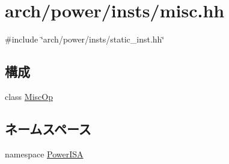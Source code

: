 \hypertarget{arch_2power_2insts_2misc_8hh}{
\section{arch/power/insts/misc.hh}
\label{arch_2power_2insts_2misc_8hh}
}
{\ttfamily \#include \char`\"{}arch/power/insts/static\_\-inst.hh\char`\"{}}\par
\subsection*{構成}
\begin{DoxyCompactItemize}
\item 
class \hyperlink{classPowerISA_1_1MiscOp}{MiscOp}
\end{DoxyCompactItemize}
\subsection*{ネームスペース}
\begin{DoxyCompactItemize}
\item 
namespace \hyperlink{namespacePowerISA}{PowerISA}
\end{DoxyCompactItemize}
